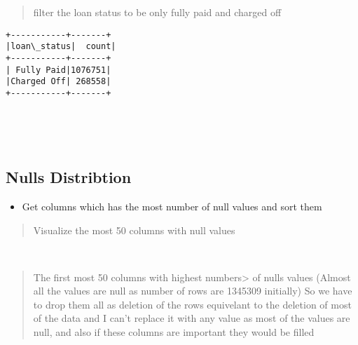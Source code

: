\documentclass[11pt]{article}
\providecommand{\tightlist}{%
      \setlength{\itemsep}{0pt}\setlength{\parskip}{0pt}}
\begin{document}
    \begin{quote}
filter the loan status to be only fully paid and charged off
\end{quote}

    \begin{Verbatim}[commandchars=\\\{\}]
+-----------+-------+
|loan\_status|  count|
+-----------+-------+
| Fully Paid|1076751|
|Charged Off| 268558|
+-----------+-------+

    \end{Verbatim}

    \begin{center}
    \end{center}
    { \hspace*{\fill} \\}
    
    \begin{center}
    \end{center}
    { \hspace*{\fill} \\}
    
    \hypertarget{nulls-distribtion}{%
\subsection{Nulls Distribtion}\label{nulls-distribtion}}

\begin{itemize}
\tightlist
\item
  Get columns which has the most number of null values and sort them
\end{itemize}

    \begin{quote}
Visualize the most 50 columns with null values
\end{quote}

    \begin{center}
    \end{center}
    { \hspace*{\fill} \\}
    
    \begin{quote}
The first most 50 columns with highest numbers\textgreater{} of nulls
values (Almost all the values are null as number of rows are 1345309
initially) So we have to drop them all as deletion of the rows
equivelant to the deletion of most of the data and I can't replace it
with any value as most of the values are null, and also if these columns
are important they would be filled
\end{quote}
\end{document}
